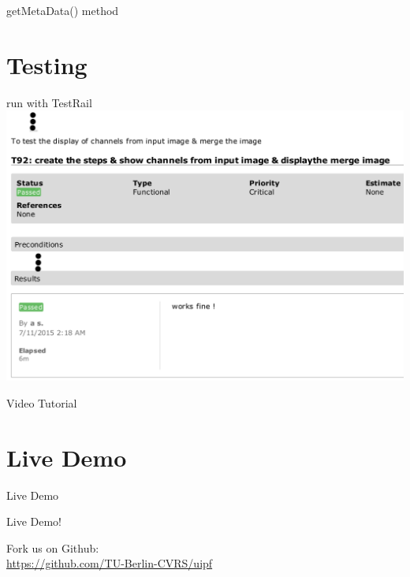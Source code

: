 \documentclass{beamer}
\newcommand{\beginbackup}{
   \newcounter{framenumbervorappendix}
   \setcounter{framenumbervorappendix}{\value{framenumber}}
}
\newcommand{\backupend}{
   \addtocounter{framenumbervorappendix}{-\value{framenumber}}
   \addtocounter{framenumber}{\value{framenumbervorappendix}}
}
\begin{document}
\begin{frame}[fragile]{getMetaData() method}

\begin{linehighlight}{
}
      
\end{linehighlight}

\end{frame}


\section{Testing}
\begin{frame}{run with TestRail}
	\includegraphics[width=\textwidth]{images/eval}
\end{frame}

\begin{frame}{Video Tutorial}
\end{frame}

\section{Live Demo}

\begin{frame}{Live Demo}

\begin{center}
	{\Huge
	Live Demo!}
	\vspace{2cm}

	Fork us on Github:\\\vspace{0.2cm}
	\url{https://github.com/TU-Berlin-CVRS/uipf}

\end{center}
\end{frame}




\end{document}
